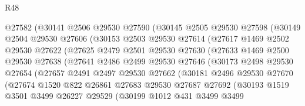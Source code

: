 \begin{lexlean}{R48}
\begin{coremodule}
                @27582
                (@30141
                  @2506
                  @29530
                  @27590
                  (@30145
                    @2505
                    @29530
                    @27598
                    (@30149
                      @2504
                      @29530
                      @27606
                      (@30153
                        @2503
                        @29530
                        @27614
                        (@27617
                          @1469
                          @2502
                          @29530
                          @27622
                          (@27625
                            @2479
                            @2501
                            @29530
                            @27630
                            (@27633
                              @1469
                              @2500
                              @29530
                              @27638
                              (@27641
                                @2486
                                @2499
                                @29530
                                @27646
                                (@30173
                                  @2498
                                  @29530
                                  @27654
                                  (@27657
                                    @2491
                                    @2497
                                    @29530
                                    @27662
                                    (@30181
                                      @2496
                                      @29530
                                      @27670
                                      (@27674
                                        @1520
                                        @822
                                        @26861
                                        @27683
                                        @29530
                                        @27687
                                        @27692
                                        (@30193
                                          @1519
                                          @3501
                                          @3499
                                          @26227
                                          @29529
                                          (@30199
                                            @1012
                                            @431
                                            @3499
                                            @3499

\end{coremodule}
\end{lexlean}
